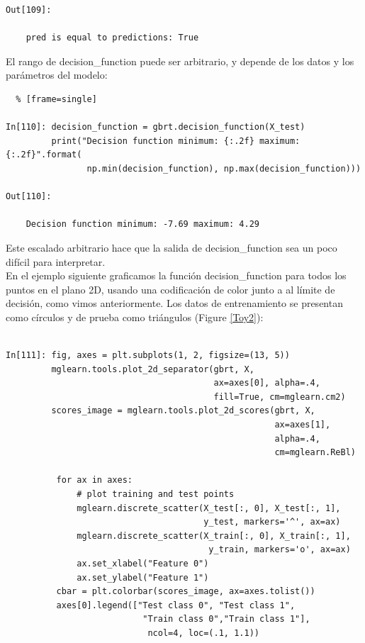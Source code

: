 {\begin{lstlisting}
Out[109]:

    pred is equal to predictions: True
\end{lstlisting}

El rango de {\ttfamily decision\_function} puede ser arbitrario, y depende de los datos y los parámetros del modelo:


\begin{lstlisting}  % [frame=single]	

In[110]: decision_function = gbrt.decision_function(X_test)
         print("Decision function minimum: {:.2f} maximum: {:.2f}".format(
                np.min(decision_function), np.max(decision_function)))

Out[110]:

    Decision function minimum: -7.69 maximum: 4.29

\end{lstlisting}

Este escalado arbitrario hace que la salida de {\ttfamily decision\_function} sea un poco difícil para interpretar.\\

En el ejemplo siguiente graficamos  la función {\ttfamily decision\_function} para todos los puntos en el plano 2D, usando una codificación de color  junto a al límite de decisión, como vimos anteriormente. Los  datos  de entrenamiento se presentan como círculos y  de  prueba como  triángulos (Figure \ref{Toy2}):\\

\begin{lstlisting} 

In[111]: fig, axes = plt.subplots(1, 2, figsize=(13, 5))
         mglearn.tools.plot_2d_separator(gbrt, X, 
                                         ax=axes[0], alpha=.4,
                                         fill=True, cm=mglearn.cm2)
         scores_image = mglearn.tools.plot_2d_scores(gbrt, X,
                                                     ax=axes[1],
                                                     alpha=.4, 
                                                     cm=mglearn.ReBl)
                                               
          for ax in axes:
              # plot training and test points
              mglearn.discrete_scatter(X_test[:, 0], X_test[:, 1], 
                                       y_test, markers='^', ax=ax)
              mglearn.discrete_scatter(X_train[:, 0], X_train[:, 1],
                                        y_train, markers='o', ax=ax)
              ax.set_xlabel("Feature 0")
              ax.set_ylabel("Feature 1")
          cbar = plt.colorbar(scores_image, ax=axes.tolist())
          axes[0].legend(["Test class 0", "Test class 1", 
                           "Train class 0","Train class 1"],
                            ncol=4, loc=(.1, 1.1))


\end{lstlisting}}
